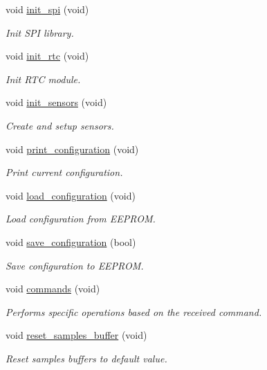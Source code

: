 \begin{DoxyCompactItemize}
void \hyperlink{i2c-th_8h_a4454f968b2402a0e61deb15ab2571dab}{init\+\_\+spi} (void)
\begin{DoxyCompactList}\small\item\em Init S\+PI library. \end{DoxyCompactList}\item 
void \hyperlink{i2c-th_8h_a88533ad02465ce52d4e6de7b2095ec32}{init\+\_\+rtc} (void)
\begin{DoxyCompactList}\small\item\em Init R\+TC module. \end{DoxyCompactList}\item 
void \hyperlink{i2c-th_8h_ad7577ba7f06f417a019b69da8682ede5}{init\+\_\+sensors} (void)
\begin{DoxyCompactList}\small\item\em Create and setup sensors. \end{DoxyCompactList}\item 
void \hyperlink{i2c-th_8h_ab08b9047f47849f399950705e769be2e}{print\+\_\+configuration} (void)
\begin{DoxyCompactList}\small\item\em Print current configuration. \end{DoxyCompactList}\item 
void \hyperlink{i2c-th_8h_a1be652e7d942160a14a560e0be837358}{load\+\_\+configuration} (void)
\begin{DoxyCompactList}\small\item\em Load configuration from E\+E\+P\+R\+OM. \end{DoxyCompactList}\item 
void \hyperlink{i2c-th_8h_a8801fa7c9f323c5b8b9b2bb5b1c438ff}{save\+\_\+configuration} (bool)
\begin{DoxyCompactList}\small\item\em Save configuration to E\+E\+P\+R\+OM. \end{DoxyCompactList}\item 
void \hyperlink{i2c-th_8h_aaad2f6556489c51f2c24302e2cb4188a}{commands} (void)
\begin{DoxyCompactList}\small\item\em Performs specific operations based on the received command. \end{DoxyCompactList}\item 
void \hyperlink{i2c-th_8h_a5f6b7d25ff64c2ddaa0fadd3058fcee3}{reset\+\_\+samples\+\_\+buffer} (void)
\begin{DoxyCompactList}\small\item\em Reset samples buffers to default value. \end{DoxyCompactList}\item 

\end{DoxyCompactItemize}

